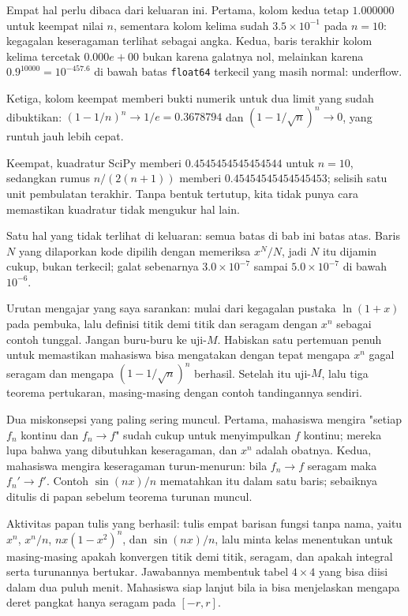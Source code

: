 Empat hal perlu dibaca dari keluaran ini. Pertama, kolom kedua tetap $1.000000$
untuk keempat nilai $n$, sementara kolom kelima sudah $3.5\times10^{-1}$ pada
$n=10$: kegagalan keseragaman terlihat sebagai angka. Kedua, baris terakhir kolom
kelima tercetak $0.000e+00$ bukan karena galatnya nol, melainkan karena
$0.9^{10000}=10^{-457.6}$ di bawah batas \texttt{float64} terkecil yang masih
normal: underflow.

Ketiga, kolom keempat memberi bukti numerik untuk dua limit yang sudah
dibuktikan: $(1-1/n)^n\to1/e=0.3678794$ dan $(1-1/\sqrt n)^n\to0$, yang runtuh
jauh lebih cepat.

Keempat, kuadratur SciPy memberi $0.4545454545454544$ untuk $n=10$, sedangkan
rumus $n/(2(n+1))$ memberi $0.45454545454545453$; selisih satu unit pembulatan
terakhir. Tanpa bentuk tertutup, kita tidak punya cara memastikan kuadratur tidak
mengukur hal lain.

Satu hal yang tidak terlihat di keluaran: semua batas di bab ini batas atas.
Baris $N$ yang dilaporkan kode dipilih dengan memeriksa $x^N/N$, jadi $N$ itu
dijamin cukup, bukan terkecil; galat sebenarnya $3.0\times10^{-7}$ sampai
$5.0\times10^{-7}$ di bawah $10^{-6}$.

\begin{untukdosen}
Urutan mengajar yang saya sarankan: mulai dari kegagalan pustaka $\ln(1+x)$ pada
pembuka, lalu definisi titik demi titik dan seragam dengan $x^n$ sebagai contoh
tunggal. Jangan buru-buru ke uji-$M$. Habiskan satu pertemuan penuh untuk
memastikan mahasiswa bisa mengatakan dengan tepat mengapa $x^n$ gagal seragam
dan mengapa $(1-1/\sqrt n)^n$ berhasil. Setelah itu uji-$M$, lalu tiga teorema
pertukaran, masing-masing dengan contoh tandingannya sendiri.

Dua miskonsepsi yang paling sering muncul. Pertama, mahasiswa mengira "setiap
$f_n$ kontinu dan $f_n\to f$" sudah cukup untuk menyimpulkan $f$ kontinu; mereka
lupa bahwa yang dibutuhkan keseragaman, dan $x^n$ adalah obatnya. Kedua,
mahasiswa mengira keseragaman turun-menurun: bila $f_n\to f$ seragam maka
$f_n'\to f'$. Contoh $\sin(nx)/n$ mematahkan itu dalam satu baris; sebaiknya
ditulis di papan sebelum teorema turunan muncul.

Aktivitas papan tulis yang berhasil: tulis empat barisan fungsi tanpa nama,
yaitu $x^n$, $x^n/n$, $nx(1-x^2)^n$, dan $\sin(nx)/n$, lalu minta kelas
menentukan untuk masing-masing apakah konvergen titik demi titik, seragam, dan
apakah integral serta turunannya bertukar. Jawabannya membentuk tabel $4\times4$
yang bisa diisi dalam dua puluh menit. Mahasiswa siap lanjut bila ia bisa
menjelaskan mengapa deret pangkat hanya seragam pada $[-r,r]$.
\end{untukdosen}

